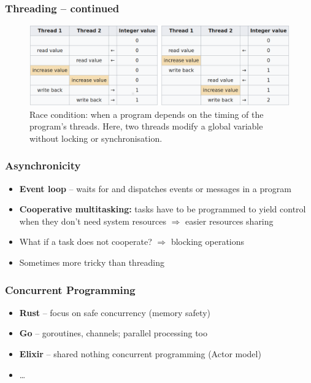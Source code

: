\documentclass{beamer}
\begin{document}
    \begin{frame}
        \frametitle{Threading -- continued}

        \begin{figure}
            \includegraphics[width=\linewidth]{../figures/race_conditions.png}
            \caption{Race condition: when a program depends on the timing of the program's threads.
            Here, two threads modify a global variable without locking or synchronisation.}
        \end{figure}

    \end{frame}


    \begin{frame}
        \frametitle{Asynchronicity}

        \begin{itemize}
            \item \textbf{Event loop} -- waits for and dispatches events or messages in a program
            \item \textbf{Cooperative multitasking:} tasks have to be programmed to yield control when
            they don't need system resources $\Rightarrow$ easier resources sharing
            \item What if a task does not cooperate? $\Rightarrow$ blocking operations
            \item Sometimes more tricky than threading
        \end{itemize}

    \end{frame}

    \begin{frame}
        \frametitle{Concurrent Programming}
        \begin{itemize}
            \item \textbf{Rust} -- focus on safe concurrency (memory safety)
            \item \textbf{Go} -- goroutines, channels; parallel processing too
            \item \textbf{Elixir} -- shared nothing concurrent programming (Actor model)
            \item \dots
        \end{itemize}

    \end{frame}
\end{document}
